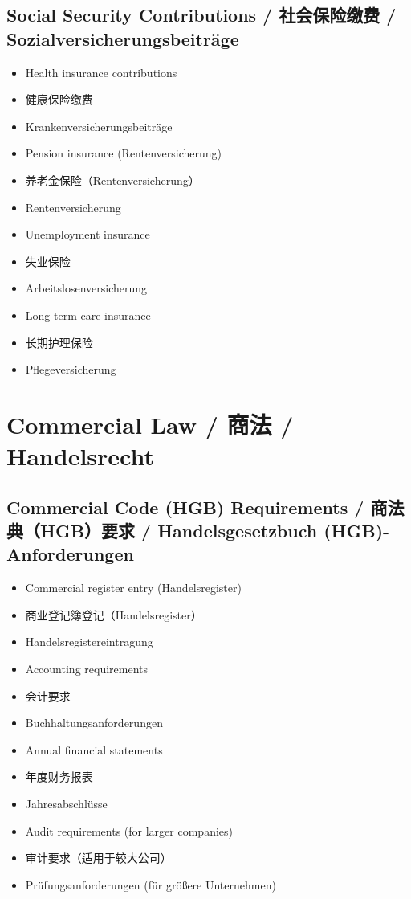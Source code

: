 \subsection{Social Security Contributions / 社会保险缴费 / Sozialversicherungsbeiträge}
\begin{itemize}
    \item Health insurance contributions
    \item 健康保险缴费
    \item Krankenversicherungsbeiträge
    \item Pension insurance (Rentenversicherung)
    \item 养老金保险（Rentenversicherung）
    \item Rentenversicherung
    \item Unemployment insurance
    \item 失业保险
    \item Arbeitslosenversicherung
    \item Long-term care insurance
    \item 长期护理保险
    \item Pflegeversicherung
\end{itemize}

\section{Commercial Law / 商法 / Handelsrecht}

\subsection{Commercial Code (HGB) Requirements / 商法典（HGB）要求 / Handelsgesetzbuch (HGB)-Anforderungen}
\begin{itemize}
    \item Commercial register entry (Handelsregister)
    \item 商业登记簿登记（Handelsregister）
    \item Handelsregistereintragung
    \item Accounting requirements
    \item 会计要求
    \item Buchhaltungsanforderungen
    \item Annual financial statements
    \item 年度财务报表
    \item Jahresabschlüsse
    \item Audit requirements (for larger companies)
    \item 审计要求（适用于较大公司）
    \item Prüfungsanforderungen (für größere Unternehmen)
\end{itemize}


